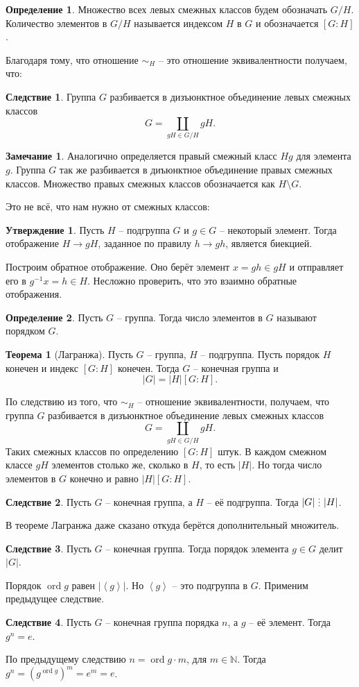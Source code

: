 \documentclass[10pt,a4paper,oneside]{book}
\theoremstyle{definition}
\newtheorem*{rem}{\color{green!50!blue}Замечание}
\newtheorem*{defn}{\color{yellow!30!red} Определение}
\newtheorem{thm}{\color{red!40!black}Теорема}
\newtheorem{cor}{\color{green!45!black}Следствие}
\newtheorem{utvr}{\color{blue!50!black}Утверждение}
\newcommand{\mb}[1]{\mathbb{#1}}
\newcommand{\ord}{\operatorname{ord}}
\newcommand{\di}{\mathop{\,\scalebox{0.85}{\raisebox{-1.2pt}[0.5\height]{\vdots}}\,}}
\def\lan{\left\langle }
\def\ran{\right\rangle}
\def\thrm{\begin{thm}}
\def\ethrm{\end{thm}}
\def\dfn{\begin{defn}}
\def\edfn{\end{defn}}
\def\crl{\begin{cor}}
\def\ecrl{\end{cor}}
\def\rm{\begin{rem}}
\def\erm{\end{rem}}
\def\utv{\begin{utvr}}
\def\eutv{\end{utvr}}
\begin{document}
\dfn Множество всех левых смежных классов будем обозначать $G/H$. Количество элементов в $G/H$ называется индексом $H$ в $G$  и обозначается $[G:H]$. 
\edfn

Благодаря тому, что отношение $\sim_H$ -- это отношение эквивалентности получаем, что:


\crl Группа $G$ разбивается в дизъюнктное объединение левых смежных классов $$G=\coprod_{ gH \in G/H} gH.$$
\ecrl




\rm Аналогично определяется правый смежный класс $Hg$ для элемента $g$. Группа $G$ так же разбивается в диъюнктное объединение правых смежных классов. Множество правых смежных классов обозначается как $H\setminus G$.
\erm 

Это не всё, что нам нужно от смежных классов:

\utv Пусть $H$ -- подгруппа $G$ и $g\in G$ -- некоторый элемент. Тогда отображение $H \to gH$, заданное по правилу $h \to gh$, является биекцией.
\eutv
\proof Построим обратное отображение. Оно берёт элемент $x=gh\in gH$ и отправляет его в $g^{-1}x=h \in H $. Несложно проверить, что это взаимно обратные отображения.
\endproof

\dfn Пусть $G$ -- группа. Тогда число элементов в $G$ называют порядком $G$.
\edfn

\thrm[Лагранжа]  Пусть $G$ -- группа, $H$ -- подгруппа. Пусть порядок  $H$ конечен и индекс $[G:H]$ конечен. Тогда $G$ -- конечная группа и 
 $$|G|=|H|[G:H].$$
\ethrm
\proof По следствию из того, что $\sim_H$ -- отношение эквивалентности, получаем, что группа $G$ разбивается в дизъюнктное объединение левых смежных классов $$G=\coprod_{gH \in G/H} gH.$$
Таких смежных классов по определению $[G:H]$ штук. В каждом смежном классе $gH$ элементов столько же, сколько в $H$, то есть $|H|$. Но тогда число элементов в $G$ конечно и равно $|H|[G:H]$.
\endproof

\crl Пусть $G$ -- конечная группа, а $H$ -- её подгруппа. Тогда $|G| \di |H|$.
\ecrl
\proof В теореме Лагранжа даже сказано откуда берётся дополнительный множитель.
\endproof

\crl Пусть $G$ -- конечная группа. Тогда порядок элемента $g\in G$ делит $|G|$.
\ecrl
\proof Порядок $\ord g$ равен $|\lan g\ran|$. Но $\lan g\ran$ -- это подгруппа в $G$. Применим предыдущее следствие.
\endproof

\crl Пусть $G$ -- конечная группа порядка $n$, а $g$ -- её элемент. Тогда $g^n=e$.
\ecrl  
\proof По предыдущему следствию $n= \ord g \cdot m$, для $m\in \mb N$. Тогда $g^n=(g^{\ord g})^m=e^m=e$. 
\endproof
\end{document}
